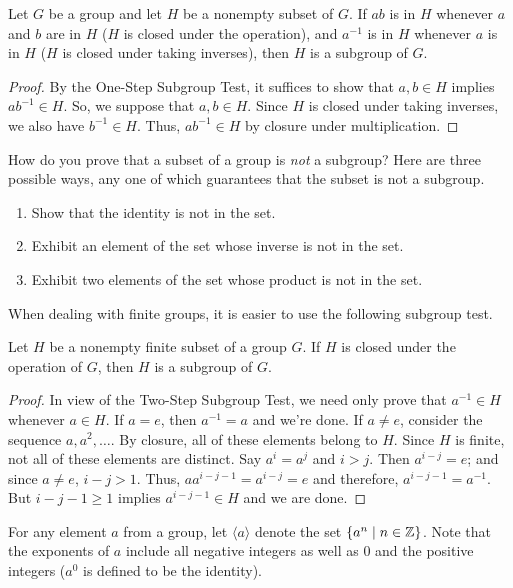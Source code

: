 \documentclass[../butidigress.tex]{subfiles}
\begin{document}
\begin{theorem}
Let $G$ be a group and let $H$ be a nonempty subset of $G$.
If $ab$ is in $H$ whenever $a$ and $b$ are in $H$ ($H$ is closed under the operation), and $a^{-1}$ is in $H$ whenever $a$ is in $H$ ($H$ is closed under taking inverses), then $H$ is a subgroup of $G$.
\end{theorem}

\begin{proof}
By the One-Step Subgroup Test, it suffices to show that $a,b \in H$ implies $ab^{-1} \in H$.
So, we suppose that $a,b \in H$.
Since $H$ is closed under taking inverses, we also have $b^{-1} \in H$.
Thus, $ab^{-1} \in H$ by closure under multiplication.
\end{proof}

How do you prove that a subset of a group is \emph{not} a subgroup?
Here are three possible ways, any one of which guarantees that the subset is not a subgroup.
\begin{enumerate}\mathlist
    \item Show that the identity is not in the set.
    \item Exhibit an element of the set whose inverse is not in the set.
    \item Exhibit two elements of the set whose product is not in the set.
\end{enumerate}

When dealing with finite groups, it is easier to use the following subgroup test.

\begin{theorem}
Let $H$ be a nonempty finite subset of a group $G$.
If $H$ is closed under the operation of $G$, then $H$ is a subgroup of $G$.
\end{theorem}

\begin{proof}
In view of the Two-Step Subgroup Test, we need only prove that $a^{-1} \in H$ whenever $a \in H$.
If $a = e$, then $a^{-1} = a$ and we're done.
If $a \neq e$, consider the sequence $a,a^{2},\ldots$.
By closure, all of these elements belong to $H$.
Since $H$ is finite, not all of these elements are distinct.
Say $a^{i} = a^{j}$ and $i > j$.
Then $a^{i-j} = e$; and since $a \neq e$, $i -j > 1$.
Thus, $aa^{i-j-1} = a^{i-j} = e$ and therefore, $a^{i-j-1} = a^{-1}$.
But $i - j - 1 \geq 1$ implies $a^{i-j-1} \in H$ and we are done.
\end{proof}

For any element $a$ from a group, let $\langle a \rangle$ denote the set $\{a^{n} \mid n \in \mathbb{Z} \}$.
Note that the exponents of $a$ include all negative integers as well as $0$ and the positive integers ($a^{0}$ is defined to be the identity).
\end{document}
